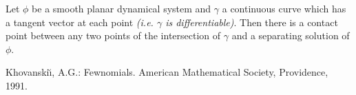 \documentclass[12pt]{article}
\begin{document}

Let $\phi$ be a smooth planar dynamical system and $\gamma$ a continuous curve which has a tangent vector at each point \textit{(i.e. $\gamma$ is differentiable)}. Then there is a contact point between any two points of the intersection of $\gamma$ and a separating solution of $\phi$.
\cite{1}
\begin{thebibliography}{1}
 Khovanski\u\i, A.G.: Fewnomials. American Mathematical Society, Providence, 1991.
\end{thebibliography}
\end{document}
